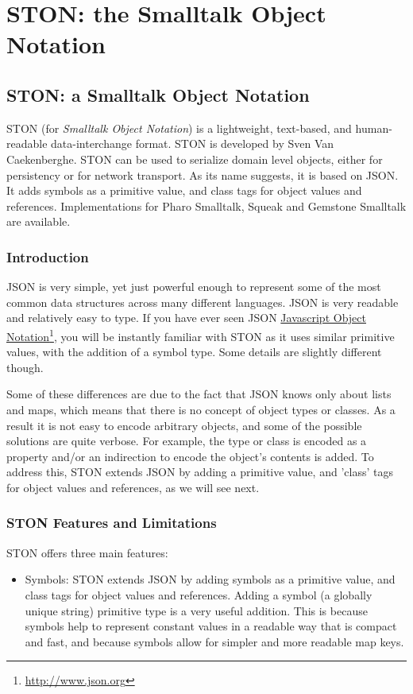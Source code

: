 \documentclass[10pt,twoside,english]{_support/latex/sbabook/sbabook}
\begin{document}
\frontmatter
\pagestyle{plain}

\tableofcontents*
\clearpage\listoffigures

\mainmatter

\part{STON: the Smalltalk Object Notation}\chapter{STON: a Smalltalk Object Notation}
STON (for \textit{Smalltalk Object Notation}) is a lightweight, text-based, and human-readable data-interchange format. STON is developed by Sven Van Caekenberghe. STON can
be used to serialize domain level objects, either for persistency or for network transport.
As its name suggests, it is based on JSON. It adds symbols as a primitive value, and class tags for object
values and references. Implementations for Pharo Smalltalk, Squeak and Gemstone Smalltalk are available.
\section{Introduction}
JSON is very simple, yet just powerful enough to represent some of the most common data structures across many different
languages. JSON is very readable and relatively easy to type. If you have ever seen JSON \href{http://www.json.org}{Javascript Object Notation}\footnote{\url{http://www.json.org}}, you will be instantly
familiar with STON as it uses similar primitive values, with the addition of a symbol type. Some details are slightly different though.

Some of these differences are due to the fact that JSON knows only about lists and maps, which means that there is no concept of object types or classes. As a
result it is not easy to encode arbitrary objects, and some of the possible solutions are quite verbose. For example, the type or class is encoded as a property
and/or an indirection to encode the object's contents is added. To address this, STON extends JSON by adding a primitive value, and 'class' tags for object
values and references, as we will see next.
\section{STON Features and Limitations}
STON offers three main features:

\begin{itemize}
\item Symbols: STON extends JSON by adding symbols as a primitive value, and class tags for object values and references. Adding a symbol (a globally unique string) primitive type is a very useful addition. This is because symbols help to represent constant values in a readable way that is compact and fast, and because  symbols allow for simpler and more readable map keys.
\end{itemize}
\end{document}
